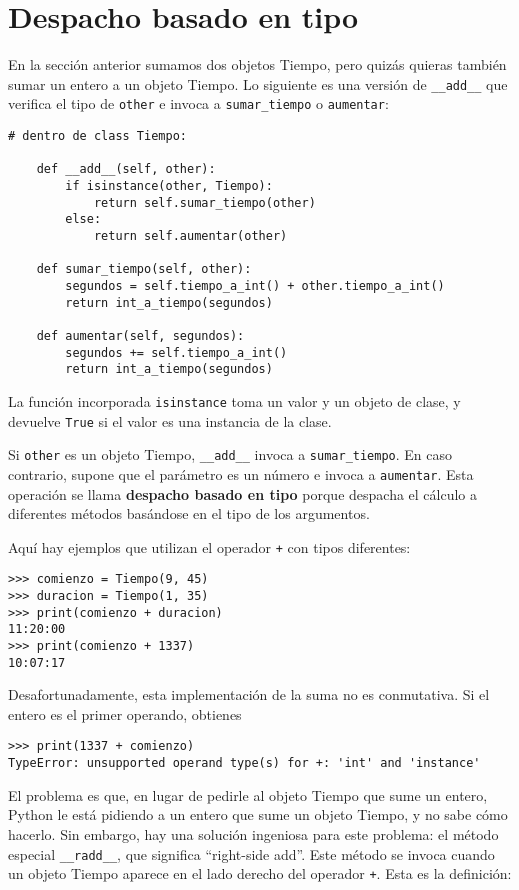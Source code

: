 \documentclass[10pt]{book}
\begin{document}
\section{Despacho basado en tipo}

En la sección anterior sumamos dos objetos Tiempo, pero quizás
quieras también sumar un entero a un objeto Tiempo.  Lo
siguiente es una versión de \verb"__add__"
que verifica el tipo de {\tt other} e invoca a
\verb"sumar_tiempo" o {\tt aumentar}:

\begin{verbatim}
# dentro de class Tiempo:

    def __add__(self, other):
        if isinstance(other, Tiempo):
            return self.sumar_tiempo(other)
        else:
            return self.aumentar(other)

    def sumar_tiempo(self, other):
        segundos = self.tiempo_a_int() + other.tiempo_a_int()
        return int_a_tiempo(segundos)

    def aumentar(self, segundos):
        segundos += self.tiempo_a_int()
        return int_a_tiempo(segundos)
\end{verbatim}
%
La función incorporada {\tt isinstance} toma un valor y un
objeto de clase, y devuelve {\tt True} si el valor es una instancia
de la clase.

Si {\tt other} es un objeto Tiempo, \verb"__add__" invoca a
\verb"sumar_tiempo".  En caso contrario, supone que el parámetro
es un número e invoca a {\tt aumentar}.  Esta operación se
llama {\bf despacho basado en tipo} porque despacha el
cálculo a diferentes métodos basándose en el tipo de los
argumentos.

Aquí hay ejemplos que utilizan el operador {\tt +} con tipos
diferentes:

\begin{verbatim}
>>> comienzo = Tiempo(9, 45)
>>> duracion = Tiempo(1, 35)
>>> print(comienzo + duracion)
11:20:00
>>> print(comienzo + 1337)
10:07:17
\end{verbatim}
%
Desafortunadamente, esta implementación de la suma no es conmutativa.
Si el entero es el primer operando, obtienes

\begin{verbatim}
>>> print(1337 + comienzo)
TypeError: unsupported operand type(s) for +: 'int' and 'instance'
\end{verbatim}
%
El problema es que, en lugar de pedirle al objeto Tiempo que sume un entero,
Python le está pidiendo a un entero que sume un objeto Tiempo, y no sabe
cómo hacerlo.  Sin embargo, hay una solución ingeniosa para este problema: el
método especial \verb"__radd__", que significa ``right-side add''.
Este método se invoca cuando un objeto Tiempo aparece en el lado derecho del
operador {\tt +}.  Esta es la definición:
\end{document}
